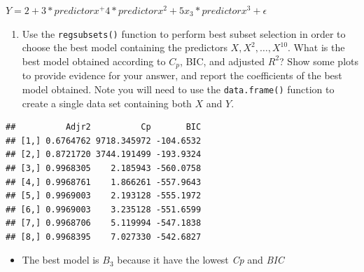 \documentclass[
]{article}
\newenvironment{Shaded}{\begin{snugshade}}{\end{snugshade}}
\newcommand{\AttributeTok}[1]{\textcolor[rgb]{0.77,0.63,0.00}{#1}}
\newcommand{\DecValTok}[1]{\textcolor[rgb]{0.00,0.00,0.81}{#1}}
\newcommand{\FunctionTok}[1]{\textcolor[rgb]{0.00,0.00,0.00}{#1}}
\newcommand{\NormalTok}[1]{#1}
\newcommand{\OtherTok}[1]{\textcolor[rgb]{0.56,0.35,0.01}{#1}}
\newcommand{\SpecialCharTok}[1]{\textcolor[rgb]{0.00,0.00,0.00}{#1}}
\newcommand{\StringTok}[1]{\textcolor[rgb]{0.31,0.60,0.02}{#1}}
\providecommand{\tightlist}{%
  \setlength{\itemsep}{0pt}\setlength{\parskip}{0pt}}
\begin{document}
\(Y = 2 + 3*predictorx^ + 4*predictorx^2 + 5x_3*predictorx^3 + \epsilon\)

\begin{enumerate}
\def\labelenumi{(\alph{enumi})}
\setcounter{enumi}{2}
\tightlist
\item
  Use the \texttt{regsubsets()} function to perform best subset
  selection in order to choose the best model containing the predictors
  \(X,X^2,\ldots,X^{10}\). What is the best model obtained according to
  \(C_p\), BIC, and adjusted \(R^2\)? Show some plots to provide
  evidence for your answer, and report the coefficients of the best
  model obtained. Note you will need to use the \texttt{data.frame()}
  function to create a single data set containing both \(X\) and \(Y\).
\end{enumerate}

\begin{Shaded}
\end{Shaded}

\begin{verbatim}
##          Adjr2          Cp       BIC
## [1,] 0.6764762 9718.345972 -104.6532
## [2,] 0.8721720 3744.191499 -193.9324
## [3,] 0.9968305    2.185943 -560.0758
## [4,] 0.9968761    1.866261 -557.9643
## [5,] 0.9969003    2.193128 -555.1972
## [6,] 0.9969003    3.235128 -551.6599
## [7,] 0.9968706    5.119994 -547.1838
## [8,] 0.9968395    7.027330 -542.6827
\end{verbatim}

\begin{itemize}
\tightlist
\item
  The best model is \(B_3\) because it have the lowest \emph{Cp} and
  \emph{BIC}
\end{itemize}
\end{document}
